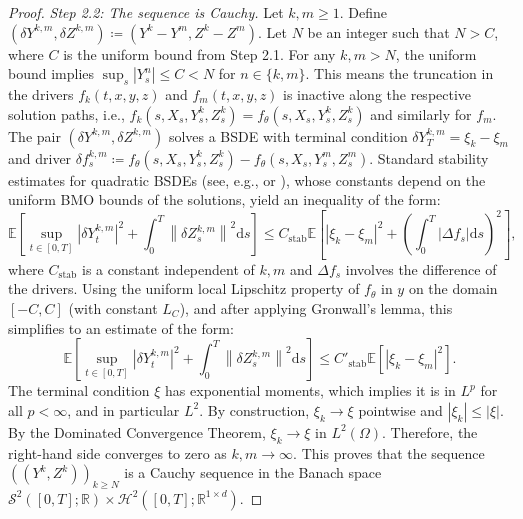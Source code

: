 \documentclass[qian]{imsart}
\newcommand{\R}{\mathbb{R}}
\newcommand{\E}{\mathbb{E}}
\newcommand{\dd}{\mathrm{d}}
\newcommand{\norm}[1]{\left\lVert#1\right\rVert}
\newcommand{\abs}[1]{\left\lvert#1\right\rvert}
\theoremstyle{plain}
\theoremstyle{definition}
\begin{document}
\begin{proof}
\emph{Step 2.2: The sequence is Cauchy.}
Let $k, m \ge 1$. Define $(\delta Y^{k,m}, \delta Z^{k,m}) \coloneqq (Y^k - Y^m, Z^k - Z^m)$. Let $N$ be an integer such that $N > C$, where $C$ is the uniform bound from Step 2.1. For any $k,m > N$, the uniform bound implies $\sup_s \abs{Y^n_s} \le C < N$ for $n \in \{k,m\}$. This means the truncation in the drivers $f_k(t,x,y,z)$ and $f_m(t,x,y,z)$ is inactive along the respective solution paths, i.e., $f_k(s,X_s,Y^k_s,Z^k_s) = f_\theta(s,X_s,Y^k_s,Z^k_s)$ and similarly for $f_m$.
The pair $(\delta Y^{k,m}, \delta Z^{k,m})$ solves a BSDE with terminal condition $\delta Y^{k,m}_T = \xi_k - \xi_m$ and driver $\delta f^{k,m}_s \coloneqq f_\theta(s, X_s, Y^k_s, Z^k_s) - f_\theta(s, X_s, Y^m_s, Z^m_s)$.
Standard stability estimates for quadratic BSDEs (see, e.g., \cite{ElKarouiPengQuenez1997} or \cite{Kobylanski2000}), whose constants depend on the uniform BMO bounds of the solutions, yield an inequality of the form:
\[ \E\left[\sup_{t \in [0,T]} \abs{\delta Y^{k,m}_t}^2 + \int_0^T \norm{\delta Z^{k,m}_s}^2 \dd s\right] \le C_{\mathrm{stab}} \E\left[\abs{\xi_k - \xi_m}^2 + \left( \int_0^T \abs{\Delta f_s} \dd s \right)^2 \right], \]
where $C_{\mathrm{stab}}$ is a constant independent of $k,m$ and $\Delta f_s$ involves the difference of the drivers. Using the uniform local Lipschitz property of $f_\theta$ in $y$ on the domain $[-C, C]$ (with constant $L_C$), and after applying Gronwall's lemma, this simplifies to an estimate of the form:
\[ \E\left[\sup_{t \in [0,T]} \abs{\delta Y^{k,m}_t}^2 + \int_0^T \norm{\delta Z^{k,m}_s}^2 \dd s\right] \le C'_{\mathrm{stab}} \E\left[\abs{\xi_k - \xi_m}^2\right]. \]
The terminal condition $\xi$ has exponential moments, which implies it is in $L^p$ for all $p < \infty$, and in particular $L^2$. By construction, $\xi_k \to \xi$ pointwise and $\abs{\xi_k} \le \abs{\xi}$. By the Dominated Convergence Theorem, $\xi_k \to \xi$ in $L^2(\Omega)$. Therefore, the right-hand side converges to zero as $k, m \to \infty$. This proves that the sequence $((Y^k, Z^k))_{k \ge N}$ is a Cauchy sequence in the Banach space $\mathcal{S}^2([0,T]; \R) \times \mathcal{H}^2([0,T]; \R^{1 \times d})$.


\end{proof}
\end{document}
